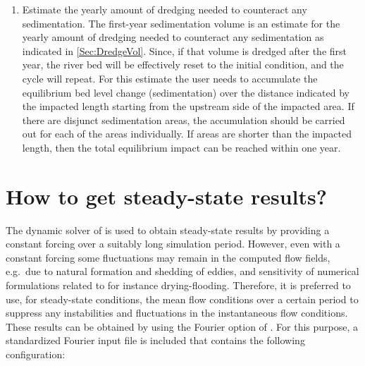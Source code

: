 \begin{enumerate}
\item Estimate the yearly amount of dredging needed to counteract any sedimentation.
The first-year sedimentation volume is an estimate for the yearly amount of dredging needed to counteract any sedimentation as indicated in \autoref{Sec:DredgeVol}.
Since, if that volume is dredged after the first year, the river bed will be effectively reset to the initial condition, and the cycle will repeat.
For this estimate the user needs to accumulate the equilibrium bed level change (sedimentation) over the distance indicated by the impacted length starting from the upstream side of the impacted area.
If there are disjunct sedimentation areas, the accumulation should be carried out for each of the areas individually.
If areas are shorter than the impacted length, then the total equilibrium impact can be reached within one year.
\end{enumerate}

\section{How to get steady-state results?}\label{Sec:SteadyState}

The dynamic solver of \dflowfm is used to obtain steady-state results by providing a constant forcing over a suitably long simulation period.
However, even with a constant forcing some fluctuations may remain in the computed flow fields, e.g.~due to natural formation and shedding of eddies, and sensitivity of numerical formulations related to for instance drying-flooding.
Therefore, it is preferred to use, for steady-state conditions, the mean flow conditions over a certain period to suppress any instabilities and fluctuations in the instantaneous flow conditions.
These results can be obtained by using the Fourier option of \dflowfm.
For this purpose, a standardized Fourier input file  is included that contains the following configuration:
\vspace{\baselineskip}
\vspace{\baselineskip}
